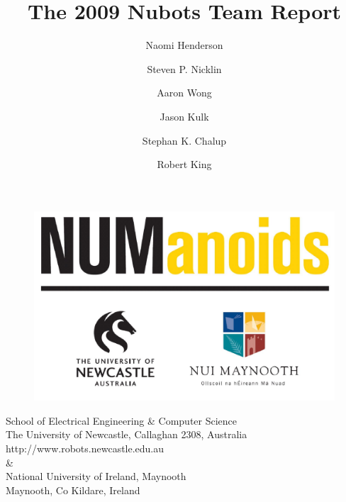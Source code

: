 \documentclass[11pt,a4paper]{article}
\title{The 2009 Nubots Team Report}
\author{ Naomi Henderson \and Steven P. Nicklin \and Aaron Wong \and Jason Kulk \and Stephan K. Chalup \and Robert King}
\begin{document}
\maketitle

\begin{figure}[!h]
\begin{center}
   \leavevmode
    \scalebox{0.2} {\includegraphics{figs/NUMANOIDS.jpg} }
    \label{fig:NUMANOIDS}
\end{center}
\end{figure}


\begin{center}
School of Electrical Engineering \& Computer Science\\
The University of Newcastle, Callaghan 2308, Australia \\
http://www.robots.newcastle.edu.au\\
\& \\
National University of Ireland, Maynooth\\
Maynooth, Co Kildare, Ireland \\

\end{center}
\newpage

\tableofcontents
\newpage











\end{document}
